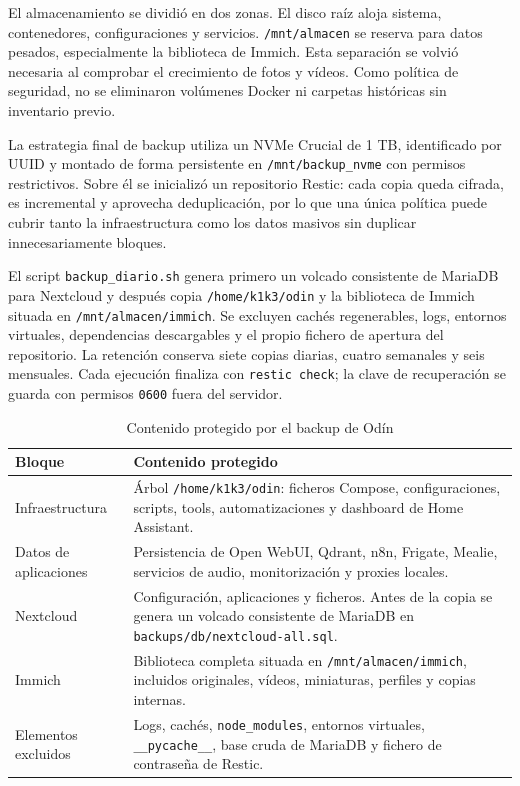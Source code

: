 El almacenamiento se dividió en dos zonas. El disco raíz aloja sistema, contenedores, configuraciones y servicios. \nolinkurl{/mnt/almacen} se reserva para datos pesados, especialmente la biblioteca de Immich. Esta separación se volvió necesaria al comprobar el crecimiento de fotos y vídeos. Como política de seguridad, no se eliminaron volúmenes Docker ni carpetas históricas sin inventario previo.

La estrategia final de backup utiliza un NVMe Crucial de 1 TB, identificado por UUID y montado de forma persistente en \nolinkurl{/mnt/backup_nvme} con permisos restrictivos. Sobre él se inicializó un repositorio Restic: cada copia queda cifrada, es incremental y aprovecha deduplicación, por lo que una única política puede cubrir tanto la infraestructura como los datos masivos sin duplicar innecesariamente bloques.

El script \nolinkurl{backup_diario.sh} genera primero un volcado consistente de MariaDB para Nextcloud y después copia \nolinkurl{/home/k1k3/odin} y la biblioteca de Immich situada en \nolinkurl{/mnt/almacen/immich}. Se excluyen cachés regenerables, logs, entornos virtuales, dependencias descargables y el propio fichero de apertura del repositorio. La retención conserva siete copias diarias, cuatro semanales y seis mensuales. Cada ejecución finaliza con \texttt{restic check}; la clave de recuperación se guarda con permisos \texttt{0600} fuera del servidor.

\begin{table}[H]
  \centering
  \caption{Contenido protegido por el backup de Odín}
  \label{tab:politica-backup-odin}
  \small
  \begin{tabularx}{\textwidth}{
    >{\raggedright\arraybackslash}p{}
    >{\raggedright\arraybackslash}X}
    \toprule
    Bloque & Contenido protegido \\
    \midrule
    Infraestructura & Árbol \texttt{/home/k1k3/odin}: ficheros Compose, configuraciones, scripts, tools, automatizaciones y dashboard de Home Assistant. \\
    Datos de aplicaciones & Persistencia de Open WebUI, Qdrant, n8n, Frigate, Mealie, servicios de audio, monitorización y proxies locales. \\
    Nextcloud & Configuración, aplicaciones y ficheros. Antes de la copia se genera un volcado consistente de MariaDB en \texttt{backups/db/nextcloud-all.sql}. \\
    Immich & Biblioteca completa situada en \texttt{/mnt/almacen/immich}, incluidos originales, vídeos, miniaturas, perfiles y copias internas. \\
    Elementos excluidos & Logs, cachés, \texttt{node\_modules}, entornos virtuales, \texttt{\_\_pycache\_\_}, base cruda de MariaDB y fichero de contraseña de Restic. \\
    \bottomrule
  \end{tabularx}
\end{table}

